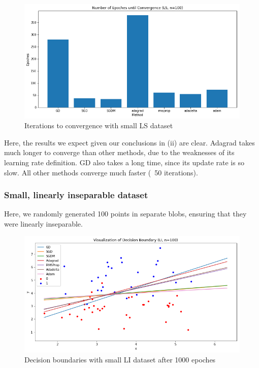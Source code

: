 \documentclass[twoside,11pt]{homework}
\begin{document}
 
\begin{figure}[H]
		\centering
		\includegraphics[scale=.5]{q5/sep_100/time.png}	
		\caption{Iterations to convergence with small LS dataset}
	\end{figure}
	
Here, the results we expect given our conclusions in (ii) are clear. Adagrad takes much longer to converge than other methods, due to the weaknesses of its learning rate definition. GD also takes a long time, since its update rate is so slow. All other methods converge much faster (~50 iterations).
	

\subsubsection{Small, linearly inseparable dataset}
Here, we randomly generated 100 points in separate blobs, ensuring that they were linearly inseparable. 
\begin{figure}[H]
		\centering
		\includegraphics[scale=.5]{q5/insep_100/lines.png}	
		\caption{Decision boundaries with small LI dataset after 1000 epoches}
	\end{figure}
	
\end{document}
